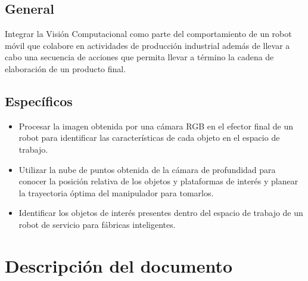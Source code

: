 \subsection{General}
Integrar la Visión Computacional como parte del comportamiento de un robot móvil que colabore en actividades de producción industrial además de  llevar a cabo una secuencia de acciones que permita llevar a término la cadena de elaboración de un producto final.
\subsection{Específicos}
\begin{itemize}
    \item Procesar la imagen obtenida por una cámara RGB en el efector final de un robot para identificar las características de cada objeto en el espacio de trabajo.
    \item Utilizar la nube de puntos  obtenida de la cámara de profundidad para conocer la posición relativa de los objetos y plataformas de interés y planear la trayectoria óptima del manipulador para tomarlos. 
    \item Identificar los objetos de interés presentes dentro del espacio de trabajo de un robot de servicio para fábricas inteligentes.
\end{itemize}
\section{Descripción del documento}